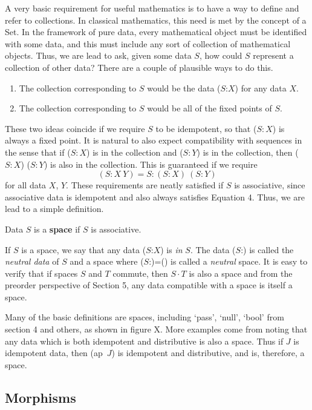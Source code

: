 \documentclass[11pt]{article}
\begin{document}
      A very basic requirement for useful mathematics is to have a way to define and refer to collections.  In classical mathematics, this 
need is met by the concept of a Set.  In the framework of pure data, every mathematical object must be identified with some data, and this must include any sort of collection of mathematical objects.  
Thus, we are lead to ask, given some data $S$, how could $S$ represent a collection of other data?  
There are a couple of plausible ways to do this.  
\begin{enumerate} 
\item The collection corresponding to $S$ would be the data ($S$:$X$) for any data $X$.
\item The collection corresponding to $S$ would be all of the fixed points of $S$.  
\end{enumerate}
These two ideas coincide if we require $S$ to be idempotent, so that ($S:X$) is always a fixed point.  It is natural to also expect compatibility with 
sequences in the sense that if ($S:X$) is in the collection and ($S:Y$) is in the collection, then ($S:X$) ($S:Y$) is also in the collection.  
This is guaranteed if we require 
\begin{equation}
(S : X\ Y) = S : (S:X)\ (S:Y)
\end{equation}
for all data $X$, $Y$.  
These requirements are neatly satisfied if $S$ is associative, since associative data is idempotent and also always satisfies 
Equation 4.  Thus, we are lead to a simple definition.  
\begin{definition} Data $S$ is a {\bf space} if $S$ is associative.
\end{definition}
\noindent If $S$ is a space, we say that any data ($S$:$X$) is {\it in} $S$.  
The data ($S$:) is called the {\it neutral data} of $S$ and a space where ($S$:)=() is called a {\it neutral} space.  
It is easy to verify that if spaces $S$ and $T$ commute, then $S\cdot T$ is 
also a space and from the preorder perspective of Section 5, any data compatible with a space is itself a space. 

Many of the basic definitions are spaces, including `pass', `null', `bool' from section 4 and others, as shown in figure X.  
More examples come from noting that any data which is both idempotent and distributive is also a space.  Thus if $J$ is idempotent data, then 
(ap\ $J$) is idempotent and distributive, and is, therefore, a space.    

\subsection{Morphisms} 
\end{document}
